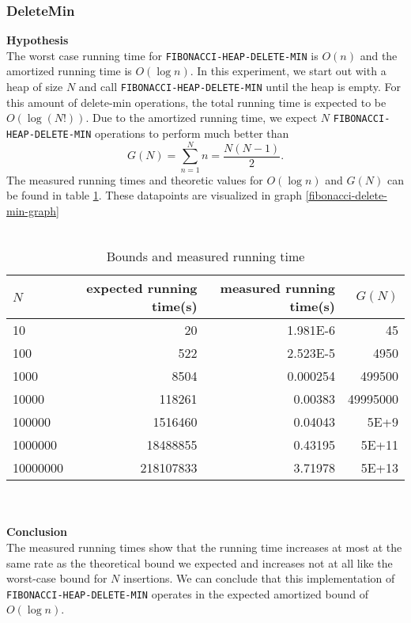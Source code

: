 \documentclass[a4paper,10pt]{article}
\begin{document}
\subsubsection{DeleteMin}
{\bf Hypothesis}\\
The worst case running time for \texttt{FIBONACCI-HEAP-DELETE-MIN} is $O(n)$ and the amortized running time is $O(\log n)$. In this experiment, we start out with a heap of size $N$ and call \texttt{FIBONACCI-HEAP-DELETE-MIN} until the heap is empty. For this amount of delete-min operations, the total running time is expected to be $O(\log(N!))$. Due to the amortized running time, we expect $N$ \texttt{FIBONACCI-HEAP-DELETE-MIN} operations to perform much better than \[G(N) = \sum^N_{n=1} n = \frac{N(N-1)}{2}.\] The measured running times and theoretic values for $O(\log n)$ and $G(N)$ can be found in table \ref{fibonacci-delete-min}. These datapoints are visualized in graph \ref{fibonacci-delete-min-graph}\\\\
\begin{table}
  \begin{center}
    \begin{tabular}{l|r|r|r}
      $N$ & expected running time(s) & measured running time(s) & $G(N)$\\
      \hline
      10       & \num{20}           & \num{1.981E-6} & \num{45}\\ 
      100      & \num{522}          & \num{2.523E-5} & \num{4950}\\
      1000     & \num{8504}         & \num{0.000254} & \num{499500}\\
      10000    & \num{118261}       & \num{0.00383}  & \num{49995000}\\
      100000   & \num{1516460}      & \num{0.04043}  & \num{5E+9}\\
      1000000  & \num{18488855}     & \num{0.43195}  & \num{5E+11}\\
      10000000 & \num{218107833}    & \num{3.71978}  & \num{5E+13}
    \end{tabular}
    \caption{Bounds and measured running time}
    \label{fibonacci-delete-min}
  \end{center}
\end{table}\\\\
{\bf Conclusion}\\
The measured running times show that the running time increases at most at the same rate as the theoretical bound we expected and increases not at all like the worst-case bound for $N$ insertions. We can conclude that this implementation of \texttt{FIBONACCI-HEAP-DELETE-MIN} operates in the expected amortized bound of $O(\log n)$.
\end{document}
